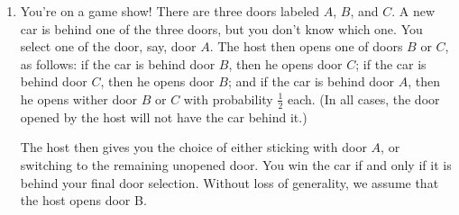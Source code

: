 \documentclass{article}
\begin{document}
\begin{enumerate}
\begin{enumerate}
                Setup: \\
                $ E = \{ (2,1),\ldots,(2,6), (1,2), (3,2), \ldots, (6,2) \}/\{(2,4),(4,2)\} $ \\
                $ |E| = 9 $ \\
                $ F = \{(1,5),(5,1),(2,4), (4,2), (3,3) \} \Rightarrow |F| = 5$
                \\ Answer: \\
                $ \frac{\frac{9}{36}}{\frac{9}{36} + \frac{5}{36}} = \frac{9}{36} \times \frac{36}{14} = \boxed{\frac{9}{14}} $
            \item What is the third possibility? What is its probability?
                Answer: \\
                 \\
                In this case we have a stopping case of
                $$ E = \{ (2,4), (4,2) \} \Rightarrow |E| = 2 $$ 
                With a probability of 
                $$ \boxed{\frac{2}{36}} $$
        \end{enumerate}

    \clearpage
    \item   You're on a game show! There are three doors labeled $A$, $B$, and $C$. A new car is behind one of the three doors, but you don't know which one. You select one of the door, say, door $A$. The host then opens one of doors $B$ or $C$, as follows: if the car is behind door $B$, then he opens door $C$; if the car is behind door $C$, then he opens door $B$; and if the car is behind door $A$, then he opens wither door $B$ or $C$ with probability $\frac{1}{2}$ each. (In all cases, the door opened by the host will  not have the car behind it.)

    The host then gives you the choice of either sticking with door $A$, or switching to the remaining unopened door. You win the car if and only if it is behind your final door selection. Without loss of generality, we assume that the host opens door B.


\end{enumerate}
\end{document}
